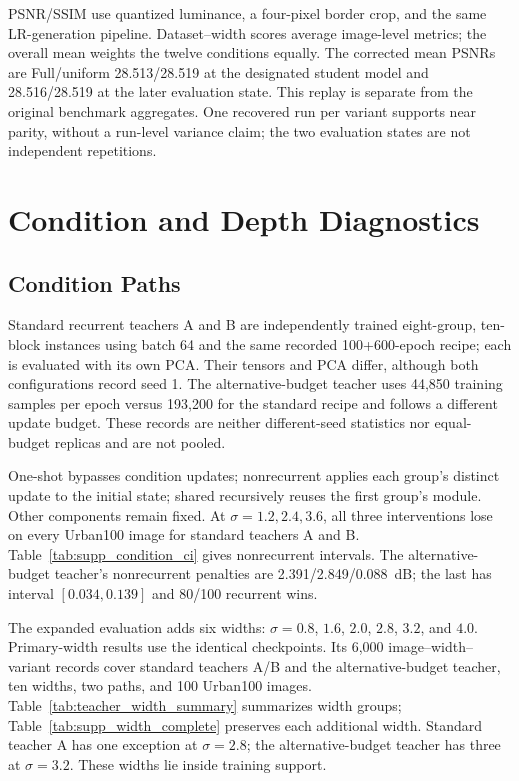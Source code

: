 \documentclass[10pt,journal,letterpaper]{IEEEtran}
\begin{document}
PSNR/SSIM use quantized luminance, a four-pixel border crop, and the same LR-generation pipeline. Dataset--width scores average image-level metrics; the overall mean weights the twelve conditions equally. The corrected mean PSNRs are Full/uniform 28.513/28.519 at the designated student model and 28.516/28.519 at the later evaluation state. This replay is separate from the original benchmark aggregates. One recovered run per variant supports near parity, without a run-level variance claim; the two evaluation states are not independent repetitions.



\section{Condition and Depth Diagnostics}
\label{sec:supp_teacher}
\subsection{Condition Paths}
Standard recurrent teachers A and B are independently trained eight-group, ten-block instances using batch 64 and the same recorded 100+600-epoch recipe; each is evaluated with its own PCA. Their tensors and PCA differ, although both configurations record seed 1. The alternative-budget teacher uses 44,850 training samples per epoch versus 193,200 for the standard recipe and follows a different update budget. These records are neither different-seed statistics nor equal-budget replicas and are not pooled.

One-shot bypasses condition updates; nonrecurrent applies each group's distinct update to the initial state; shared recursively reuses the first group's module. Other components remain fixed. At $\sigma=1.2,2.4,3.6$, all three interventions lose on every Urban100 image for standard teachers A and B. Table~\ref{tab:supp_condition_ci} gives nonrecurrent intervals. The alternative-budget teacher's nonrecurrent penalties are 2.391/2.849/0.088~dB; the last has interval $[0.034,0.139]$ and 80/100 recurrent wins. 





The expanded evaluation adds six widths: $\sigma=0.8$, $1.6$, $2.0$, $2.8$, $3.2$, and $4.0$. Primary-width results use the identical checkpoints. Its 6,000 image--width--variant records cover standard teachers A/B and the alternative-budget teacher, ten widths, two paths, and 100 Urban100 images. Table~\ref{tab:teacher_width_summary} summarizes width groups; Table~\ref{tab:supp_width_complete} preserves each additional width. Standard teacher A has one exception at $\sigma=2.8$; the alternative-budget teacher has three at $\sigma=3.2$. These widths lie inside training support.
\end{document}
